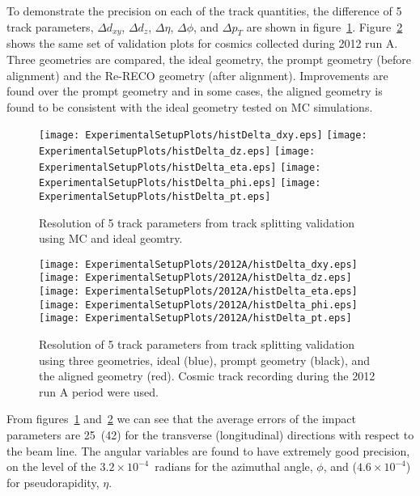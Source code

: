 To demonstrate the precision on each of the track quantities, the
difference of 5 track parameters, $\Delta d_{xy}$, $\Delta d_z$, 
$\Delta \eta$, $\Delta\phi$, and $\Delta p_T$ are shown in 
figure~\ref{fig:trackSplittingMC}.  
Figure~\ref{fig:trackSplitting2012A} shows
the same set of validation plots for cosmics collected during
2012 run A.  Three geometries are compared, the ideal geometry, the 
prompt geometry (before alignment) and the Re-RECO geometry (after 
alignment).  Improvements are found over the prompt geometry and
in some cases, the aligned geometry is found to be consistent 
with the ideal geometry tested on MC simulations.  

\begin{figure}
\begin{center}
\texttt{[image: ExperimentalSetupPlots/histDelta\_dxy.eps]}
\texttt{[image: ExperimentalSetupPlots/histDelta\_dz.eps]}
\texttt{[image: ExperimentalSetupPlots/histDelta\_eta.eps]}
\texttt{[image: ExperimentalSetupPlots/histDelta\_phi.eps]}
\texttt{[image: ExperimentalSetupPlots/histDelta\_pt.eps]}
\caption{Resolution of 5 track parameters from track splitting validation 
using MC and ideal geomtry. }
\label{fig:trackSplittingMC}
\end{center}
\end{figure}

\begin{figure}
\begin{center}
\texttt{[image: ExperimentalSetupPlots/2012A/histDelta\_dxy.eps]}
\texttt{[image: ExperimentalSetupPlots/2012A/histDelta\_dz.eps]}
\texttt{[image: ExperimentalSetupPlots/2012A/histDelta\_eta.eps]}
\texttt{[image: ExperimentalSetupPlots/2012A/histDelta\_phi.eps]}
\texttt{[image: ExperimentalSetupPlots/2012A/histDelta\_pt.eps]}
\caption{Resolution of 5 track parameters from track splitting validation 
using three geometries, ideal (blue), prompt geometry (black), and the
aligned geometry (red).  Cosmic track recording during the 2012 run A
period were used.}
\label{fig:trackSplitting2012A}
\end{center}
\end{figure}

From figures~\ref{fig:trackSplittingMC} and~\ref{fig:trackSplitting2012A} we can see 
that the average errors of the impact parameters are 25\microns~(42\microns) for the 
transverse (longitudinal) directions with respect to the beam line.  The angular
variables are found to have extremely good precision, on the level of the $3.2\times10^{-4}$~radians 
for the azimuthal angle, $\phi$, and ($4.6\times10^{-4}$) for pseudorapidity, $\eta$.

